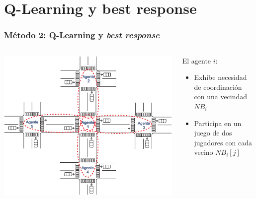 \documentclass[11pt]{beamer}
\begin{document}
\section{Q-Learning y best response}
\begin{frame}
\frametitle{Método 2: Q-Learning y \textit{best response}}
\begin{columns}[T]
\begin{column}{.6\textwidth}
\includegraphics[scale=0.6]{./graficas/exBR.eps}
\end{column}
\begin{column}{.4\textwidth}
El agente $i$:\\
\begin{itemize}
\setlength{\itemindent}{-0.1in}
\item Exhibe necesidad de coordinación con una vecindad $NB_i$
\item Participa en un juego de dos jugadores con cada vecino $NB_i[j]$
\end{itemize}
\end{column}
\end{columns}
\end{frame}
\end{document}
